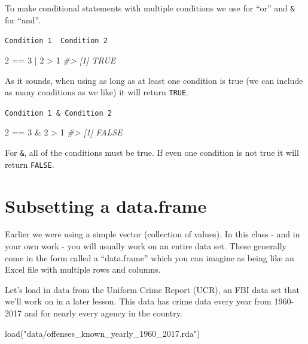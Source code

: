 \documentclass[
  12pt,
]{book}
\newenvironment{Shaded}{\begin{snugshade}}{\end{snugshade}}
\newcommand{\CommentTok}[1]{\textcolor[rgb]{0.37,0.37,0.37}{\textit{#1}}}
\newcommand{\DecValTok}[1]{\textcolor[rgb]{0.06,0.06,0.06}{#1}}
\newcommand{\FunctionTok}[1]{\textcolor[rgb]{0,0,0}{#1}}
\newcommand{\NormalTok}[1]{#1}
\newcommand{\SpecialCharTok}[1]{\textcolor[rgb]{0,0,0}{#1}}
\newcommand{\StringTok}[1]{\textcolor[rgb]{0.5,0.5,0.5}{#1}}
\begin{document}
To make conditional statements with multiple conditions we use \texttt{\textbar{}} for ``or'' and \texttt{\&} for ``and''.

\texttt{Condition\ 1\ \textbar{}\ Condition\ 2}

\begin{Shaded}
\begin{Highlighting}[]
\DecValTok{2} \SpecialCharTok{==} \DecValTok{3} \SpecialCharTok{|} \DecValTok{2} \SpecialCharTok{\textgreater{}} \DecValTok{1}
\CommentTok{\#\textgreater{} [1] TRUE}
\end{Highlighting}
\end{Shaded}

As it sounds, when using \texttt{\textbar{}} as long as at least one condition is true (we can include as many conditions as we like) it will return \texttt{TRUE}.

\texttt{Condition\ 1\ \&\ Condition\ 2}

\begin{Shaded}
\begin{Highlighting}[]
\DecValTok{2} \SpecialCharTok{==} \DecValTok{3} \SpecialCharTok{\&} \DecValTok{2} \SpecialCharTok{\textgreater{}} \DecValTok{1}
\CommentTok{\#\textgreater{} [1] FALSE}
\end{Highlighting}
\end{Shaded}

For \texttt{\&}, all of the conditions must be true. If even one condition is not true it will return \texttt{FALSE}.

\hypertarget{subsetting-a-data.frame}{%
\section{Subsetting a data.frame}\label{subsetting-a-data.frame}}

Earlier we were using a simple vector (collection of values). In this class - and in your own work - you will usually work on an entire data set. These generally come in the form called a ``data.frame'' which you can imagine as being like an Excel file with multiple rows and columns.

Let's load in data from the Uniform Crime Report (UCR), an FBI data set that we'll work on in a later lesson. This data has crime data every year from 1960-2017 and for nearly every agency in the country.

\begin{Shaded}
\begin{Highlighting}[]
\FunctionTok{load}\NormalTok{(}\StringTok{"data/offenses\_known\_yearly\_1960\_2017.rda"}\NormalTok{)}
\end{Highlighting}
\end{Shaded}
\end{document}
